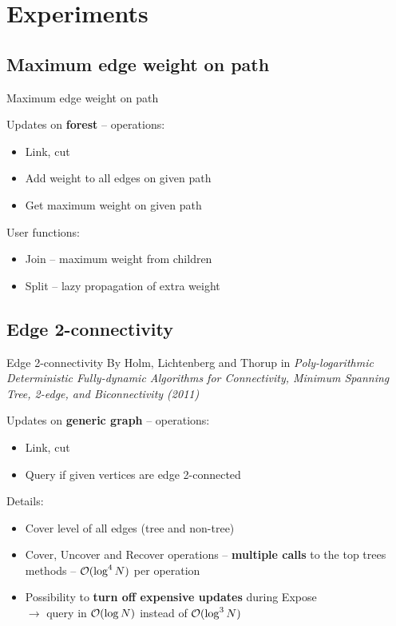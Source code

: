 \documentclass{beamer}				%
\newcommand*{\mysectionpage}{\usebeamertemplate*{my section page}}
\begin{document}

\section{Experiments}
\begin{frame}
\mysectionpage
\end{frame}

\subsection{Maximum edge weight on path}
\begin{frame}{Maximum edge weight on path}

Updates on {\bf forest} -- operations:
\begin{itemize}
	\item Link, cut
	\item Add weight to all edges on given path
	\item Get maximum weight on given path
\end{itemize}

\bigskip\pause
User functions:
\begin{itemize}
\item Join -- maximum weight from children
\item Split -- lazy propagation of extra weight
\end{itemize}

\end{frame}

\subsection{Edge 2-connectivity}
\begin{frame}{Edge 2-connectivity}
By Holm, Lichtenberg and Thorup in {\it Poly-logarithmic
Deterministic Fully-dynamic Algorithms for Connectivity, Minimum Spanning Tree,
2-edge, and Biconnectivity (2011)}

\bigskip

Updates on {\bf generic graph} -- operations:
\begin{itemize}
	\item Link, cut
	\item Query if given vertices are edge 2-connected
\end{itemize}

\bigskip\pause
Details:
\begin{itemize}
\item Cover level of all edges (tree and non-tree)
\item Cover, Uncover and Recover operations -- {\bf multiple calls} to the
top trees methods -- ${\cal O}(\log^4 N)$ per operation
\pause\item Possibility to {\bf turn off expensive updates} during Expose\\ $\rightarrow$
query in ${\cal O}(\log N)$ instead of ${\cal O}(\log^3 N)$
\end{itemize}

\end{frame}
\end{document}
